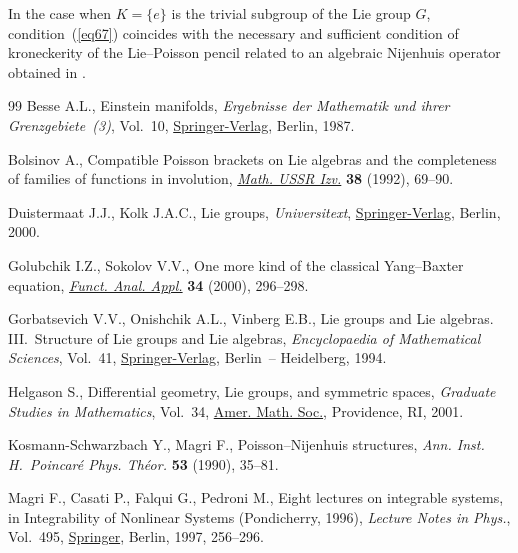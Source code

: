 \documentclass[11pt]{article}
\numberwithin{equation}{section}
\begin{document}
\begin{Remark}\label{remarr} In the case when $K=\{e\}$ is the trivial subgroup of the Lie group $G$, condition~(\ref{eq67}) coincides with the necessary and sufficient condition of kroneckerity of the Lie--Poisson pencil related to an algebraic Nijenhuis operator obtained in \cite[Theorem~2.5]{p5}.
\end{Remark}
\begin{thebibliography}{99}
Besse A.L., Einstein manifolds, \textit{Ergebnisse der Mathematik und ihrer
 Grenzgebiete~(3)}, Vol.~10, \href{https://doi.org/10.1007/978-3-540-74311-8}{Springer-Verlag}, Berlin, 1987.

Bolsinov A., Compatible {P}oisson brackets on {L}ie algebras and the
 completeness of families of functions in involution, \href{https://doi.org/10.1070/IM1992v038n01ABEH002187}{\textit{Math. USSR Izv.}}
 \textbf{38} (1992), 69--90.

Duistermaat J.J., Kolk J.A.C., Lie groups, \textit{Universitext}, \href{https://doi.org/10.1007/978-3-642-56936-4}{Springer-Verlag},
 Berlin, 2000.

Golubchik I.Z., Sokolov V.V., One more kind of the classical {Y}ang--{B}axter
 equation, \href{https://doi.org/10.1023/A:1004113508705}{\textit{Funct. Anal. Appl.}} \textbf{34} (2000), 296--298.

Gorbatsevich V.V., Onishchik A.L., Vinberg E.B., Lie groups and Lie algebras.
 III.~Structure of Lie groups and Lie algebras, \textit{Encyclopaedia of
 Mathematical Sciences}, Vol.~41, \href{https://doi.org/10.1007/978-3-642-56936-4}{Springer-Verlag}, Berlin~-- Heidelberg, 1994.

Helgason S., Differential geometry, {L}ie groups, and symmetric spaces,
 \textit{Graduate Studies in Mathematics}, Vol.~34, \href{https://doi.org/10.1090/gsm/034}{Amer. Math.
 Soc.}, Providence, RI, 2001.

Kosmann-Schwarzbach Y., Magri F., Poisson--{N}ijenhuis structures, \textit{Ann.
 Inst. H.~Poincar\'{e} Phys. Th\'{e}or.} \textbf{53} (1990), 35--81.

Magri F., Casati P., Falqui G., Pedroni M., Eight lectures on integrable
 systems, in Integrability of Nonlinear Systems ({P}ondicherry, 1996),
 \textit{Lecture Notes in Phys.}, Vol.~495, \href{https://doi.org/10.1007/BFb0113698}{Springer}, Berlin, 1997, 256--296.


\end{thebibliography}
\end{document}
